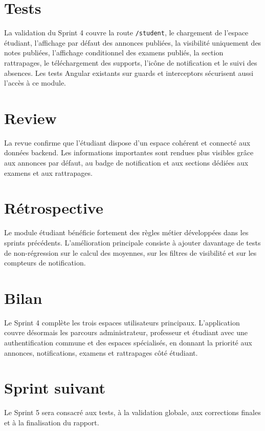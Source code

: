 \documentclass[12pt,a4paper]{report}
\begin{document}
\section{Tests}

La validation du Sprint 4 couvre la route \texttt{/student}, le chargement de l'espace étudiant, l'affichage par défaut des annonces publiées, la visibilité uniquement des notes publiées, l'affichage conditionnel des examens publiés, la section rattrapages, le téléchargement des supports, l'icône de notification et le suivi des absences. Les tests Angular existants sur guards et interceptors sécurisent aussi l'accès à ce module.

\section{Review}

La revue confirme que l'étudiant dispose d'un espace cohérent et connecté aux données backend. Les informations importantes sont rendues plus visibles grâce aux annonces par défaut, au badge de notification et aux sections dédiées aux examens et aux rattrapages.

\section{Rétrospective}

Le module étudiant bénéficie fortement des règles métier développées dans les sprints précédents. L'amélioration principale consiste à ajouter davantage de tests de non-régression sur le calcul des moyennes, sur les filtres de visibilité et sur les compteurs de notification.

\section{Bilan}

Le Sprint 4 complète les trois espaces utilisateurs principaux. L'application couvre désormais les parcours administrateur, professeur et étudiant avec une authentification commune et des espaces spécialisés, en donnant la priorité aux annonces, notifications, examens et rattrapages côté étudiant.

\section{Sprint suivant}

Le Sprint 5 sera consacré aux tests, à la validation globale, aux corrections finales et à la finalisation du rapport.
\end{document}
